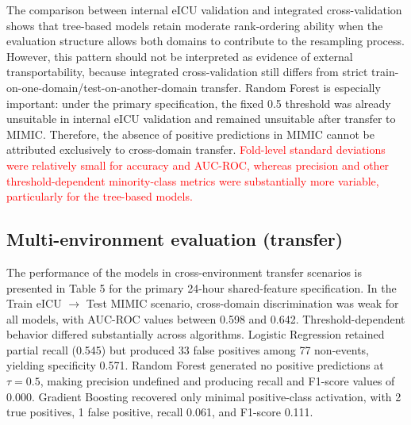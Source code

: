 \documentclass[utf8]{FrontiersinHarvard} %
\begin{document}
The comparison between internal eICU validation and integrated cross-validation shows that tree-based models retain moderate rank-ordering ability when the evaluation structure allows both domains to contribute to the resampling process. However, this pattern should not be interpreted as evidence of external transportability, because integrated cross-validation still differs from strict train-on-one-domain/test-on-another-domain transfer. Random Forest is especially important: under the primary specification, the fixed 0.5 threshold was already unsuitable in internal eICU validation and remained unsuitable after transfer to MIMIC. Therefore, the absence of positive predictions in MIMIC cannot be attributed exclusively to cross-domain transfer. \textcolor{red}{Fold-level standard deviations were relatively small for accuracy and AUC-ROC, whereas precision and other threshold-dependent minority-class metrics were substantially more variable, particularly for the tree-based models.}

\subsection{Multi-environment evaluation (transfer)}
The performance of the models in cross-environment transfer scenarios is presented in Table 5 for the primary 24-hour shared-feature specification. In the Train eICU $\rightarrow$ Test MIMIC scenario, cross-domain discrimination was weak for all models, with AUC-ROC values between 0.598 and 0.642. Threshold-dependent behavior differed substantially across algorithms. Logistic Regression retained partial recall (0.545) but produced 33 false positives among 77 non-events, yielding specificity 0.571. Random Forest generated no positive predictions at $\tau=0.5$, making precision undefined and producing recall and F1-score values of 0.000. Gradient Boosting recovered only minimal positive-class activation, with 2 true positives, 1 false positive, recall 0.061, and F1-score 0.111.
\end{document}
